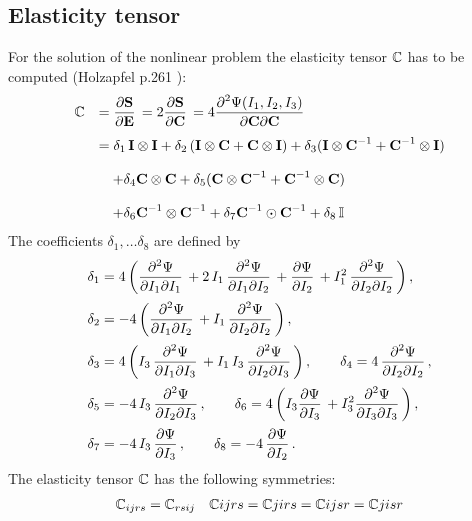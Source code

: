 \subsection{Elasticity tensor}
For the solution of the nonlinear problem the elasticity tensor $\mathbb{C}$ has to be computed (Holzapfel p.261  \cite{holzapfel2000nonlinear}):
\begin{equation*}
  \begin{array}{lll}
    \bbC &= \p{\bfS}{\bfE} = 2\p{\bfS}{\bfC} = 4\dfrac{\partial^2\Psi(I_1,I_2,I_3)}{\p\bfC\p\bfC}\\[4mm]
     &= \delta_1\,\bfI \otimes \bfI + \delta_2\,(\bfI \otimes \bfC + \bfC \otimes \bfI) + \delta_3 ( \bfI \otimes \bfC^{-1} + \bfC^{-1} \otimes \bfI)\\[4mm]
     &\quad +  \delta_4 \bfC \otimes \bfC + \delta_5(\bfC \otimes \bfC^{-1} + \bfC^{-1}\otimes \bfC) \\[4mm]
     & \quad + \delta_6 \bfC^{-1} \otimes \bfC^{-1} + \delta_7 \bfC^{-1} \odot \bfC^{-1} + \delta_8\,\bbI
  \end{array}
\end{equation*}
The coefficients $\delta_1, \dots \delta_8$ are defined by
\begin{equation*}
  \begin{array}{lll}
    \delta_1 = 4\left(\dfrac{\partial^2\Psi}{\p I_1 \p I_1} + 2\,I_1\,\dfrac{\partial^2\Psi}{\p I_1 \p I_2} + \p{\Psi}{I_2} + I_1^2\,\dfrac{\partial^2\Psi}{\p I_2 \p I_2} \right),\\[4mm]
    \delta_2 = -4\left(\dfrac{\partial^2\Psi}{\p I_1 \p I_2} + I_1\,\dfrac{\partial^2\Psi}{\p I_2 \p I_2}\right),\\[4mm]
    \delta_3 = 4\left(I_3\,\dfrac{\partial^2\Psi}{\p I_1 \p I_3} + I_1\,I_3\,\dfrac{\partial^2\Psi}{\p I_2 \p I_3}\right), \qquad \delta_4 = 4\,\dfrac{\partial^2\Psi}{\p I_2 \p I_2},\\[4mm]
    \delta_5 = -4\,I_3\,\dfrac{\partial^2\Psi}{\p I_2 \p I_3}, \qquad \delta_6 = 4\left(I_3\p{\Psi}{I_3} + I_3^2\dfrac{\partial^2\Psi}{\p I_3 \p I_3}\right),\\[4mm]
    \delta_7 = -4\,I_3\,\p{\Psi}{I_3}, \qquad \delta_8 = -4\,\p{\Psi}{I_2}.
  \end{array}
\end{equation*}
The elasticity tensor $\mathbb{C}$ has the following symmetries:
\begin{equation*}
  \begin{array}{lll}
    \mathbb{C}_{ijrs} = \mathbb{C}_{rsij}\quad \mathbb{C}{ijrs} = \mathbb{C}{jirs} = \mathbb{C}{ijsr} = \mathbb{C}{jisr}
  \end{array}
\end{equation*}
